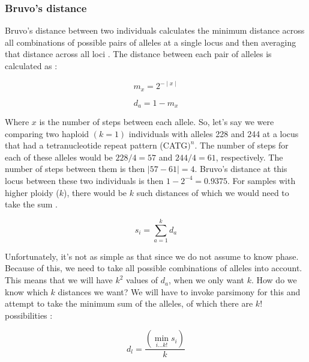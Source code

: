 \documentclass[letterpaper]{article}\usepackage[]{graphicx}\usepackage[]{color}
\newcommand{\tab}{\hspace*{1em}}
\begin{document}
\subsubsection{Bruvo's distance}
\label{appendix:algorithm:bruvo}

\tab \tab Bruvo's distance between two individuals calculates the minimum distance across all combinations of possible pairs of alleles at a single locus and then averaging that distance across all loci \cite{Bruvo:2004}. The distance between each pair of alleles is calculated as \cite{Bruvo:2004}:

\begin{equation}
\label{eq:m_x}
m_x = 2^{-\mid x \mid}
\end{equation}

\begin{equation}
\label{eq:d_a}
d_a = 1 - m_x
\end{equation}

Where $x$ is the number of steps between each allele. So, let's say we were comparing two haploid $(k = 1)$ individuals with alleles 228 and 244 at a locus that had a tetranucleotide repeat pattern (CATG$)^n$. The number of steps for each of these alleles would be $228/4 = 57$ and $244/4 =61$, respectively. The number of steps between them is then $\mid 57 - 61 \mid = 4$. Bruvo's distance at this locus between these two individuals is then $1-2^{-4} = 0.9375$. For samples with higher ploidy ($k$), there would be $k$ such distances of which we would need to take the sum \cite{Bruvo:2004}.

\begin{equation}
\label{eq:s_i}
s_i = \displaystyle \sum_{a=1}^{k} d_a
\end{equation}

Unfortunately, it's not as simple as that since we do not assume to know phase. Because of this, we need to take all possible combinations of alleles into account. This means that we will have $k^2$ values of $d_a$, when we only want $k$. How do we know which $k$ distances we want? We will have to invoke parsimony for this and attempt to take the minimum sum of the alleles, of which there are $k!$ possibilities \cite{Bruvo:2004}:

\begin{equation}
\label{eq:d_l}
d_l = \frac{\left(\displaystyle \min_{i \dotsc k!} s_i\right)}{k}
\end{equation}
\end{document}
